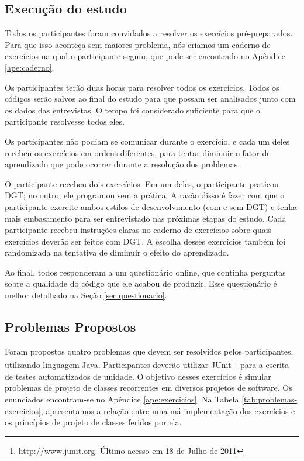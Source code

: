 \subsection{Execução do estudo}
\label{sec:execucao}	

Todos os participantes foram convidados a resolver os exercícios pré-preparados. 
Para que isso aconteça sem maiores problema, nós criamos um caderno
de exercícios na qual o participante seguiu, que pode ser encontrado
no Apêndice \ref{ape:caderno}.

Os participantes terão duas horas para resolver todos os exercícios. 
Todos os códigos serão salvos ao final do estudo para que possam ser analisados junto
com os dados das entrevistas.
O tempo foi considerado suficiente para que o participante resolvesse todos eles. 

Os participantes não podiam se comunicar durante o exercício, e cada um deles recebeu
os exercícios em ordens diferentes, para tentar diminuir o fator de aprendizado que 
pode ocorrer durante a resolução dos problemas. 

O participante recebeu dois exercícios. Em um deles, o participante praticou DGT; no outro,
ele programou sem a prática. A razão disso
é fazer com que o participante exercite ambos estilos de desenvolvimento (com e sem DGT)
e tenha mais embasamento para ser entrevistado nas próximas etapas do estudo. 
Cada participante recebeu instruções claras no caderno de exercícios 
sobre quais exercícios deverão ser feitos
com DGT. A escolha desses exercícios também foi randomizada na tentativa de diminuir
o efeito do aprendizado.

Ao final, todos responderam a um questionário online, 
que continha perguntas sobre a qualidade
do código que ele acabou de produzir. Esse questionário
é melhor detalhado na Seção \ref{sec:questionario}.

\subsection{Problemas Propostos}
\label{sec:exercicios}

Foram propostos quatro problemas que devem ser resolvidos pelos participantes, utilizando
linguagem Java. Participantes deverão utilizar JUnit \footnote{\url{http://www.junit.org}. 
Último acesso em 18 de Julho de 2011} para a escrita de testes
automatizados de unidade. O objetivo desses exercícios é simular problemas de projeto de classes 
recorrentes em diversos projetos de software. Os enunciados encontram-se no Apêndice 
\ref{ape:exercicios}.
Na Tabela \ref{tab:problemas-exercicios}, apresentamos a relação entre uma má
implementação dos exercícios e os princípios de projeto de classes feridos por
ela.

